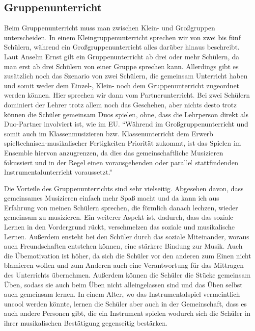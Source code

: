 \subsection{Gruppenunterricht} 
Beim Gruppenunterricht muss man zwischen Klein- und Großgruppen unterscheiden.
In einem Kleingruppenunterricht sprechen wir von zwei bis fünf Schülern, während
ein Großgruppenunterricht alles darüber hinaus beschreibt.
\autocite[219]{busch:grundwissen_instrumentalpaedagogik} Laut Anselm Ernst gilt
ein Gruppenunterricht ab drei oder mehr Schülern, da man erst ab drei Schülern
von einer Gruppe sprechen kann.
\autocite[79]{ernst:die_zukunftsfaehige_musikschule}
Allerdings gibt es zusätzlich noch das Szenario von zwei Schülern, die gemeinsam
Unterricht haben und somit weder dem Einzel-, Klein- noch dem Gruppenunterricht
zugeordnet werden können. Hier sprechen wir dann vom
Partnerunterricht.\autocite[219]{busch:grundwissen_instrumentalpaedagogik} Bei
zwei Schülern dominiert der Lehrer trotz allem noch das Geschehen, aber nichts
desto trotz können die Schüler gemeinsam Duos spielen, ohne, dass die Lehrperson
direkt als Duo-Partner involviert ist, wie im EU. \enquote{Während im
Großgruppenunterricht und somit auch im Klassenmusizieren bzw. Klassenunterricht
dem Erwerb spieltechnisch-musikalischer Fertigkeiten Priorität zukommt, ist das
Spielen im Ensemble hiervon anzugrenzen, da dies das gemeinschaftliche
Musizieren fokussiert und in der Regel einen vorausgehenden oder parallel
stattfindenden Instrumentalunterricht
voraussetzt.}\autocite[219]{busch:grundwissen_instrumentalpaedagogik}

Die Vorteile des Gruppenunterrichts sind sehr vielseitig. Abgesehen davon, dass
gemeinsames Musizieren einfach mehr Spaß macht und da kann ich aus Erfahrung von
meinen Schülern sprechen, die förmlich danach lechzen, wieder gemeinsam zu
musizieren. Ein weiterer Aspekt ist, dadurch, dass das soziale Lernen in den
Vordergrund rückt, verschmelzen das soziale und musikalische Lernen. Außerdem
ensteht bei den Schüler durch das soziale Miteinander, woraus auch
Freundschaften entstehen können, eine stärkere Bindung zur Musik. Auch die
Übemotivation ist höher, da sich die Schüler vor den anderen zum Einen nicht
blamieren wollen und zum Anderen auch eine Verantwortung für das Mittragen des
Unterrichts übernehmen. Außerdem können die Schüler die Stücke gemeinsam Üben,
sodass sie auch beim Üben nicht alleingelassen sind und das Üben selbst auch
gemeinsam lernen. In einem Alter, wo das Instrumentalspiel vermeintlich
uncool werden könnte, lernen die Schüler aber auch in der Gemeinschaft, dass es
auch andere Personen gibt, die ein Instrument spielen wodurch sich die Schüler
in ihrer musikalischen Bestätigung gegenseitig bestärken.
\autocite{ernst:die_zukunftsfaehige_musikschule}

